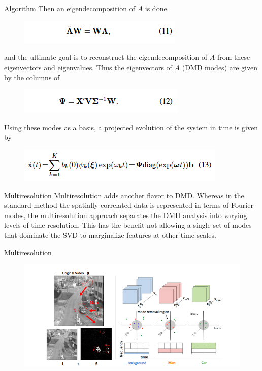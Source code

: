 \documentclass{beamer} \usepackage{graphicx,amsmath,amsfonts,amssymb,listings,tikz} \usepackage{multimedia}
\begin{document}
\begin{frame}{Algorithm}
    Then an eigendecomposition of $\widetilde{A}$ is done
    \begin{figure}
        \center
        \includegraphics[scale=0.5]{eigen.png}
    \end{figure}
    and the ultimate goal is to reconstruct the eigendecomposition of $A$ from
    these eigenvectors and eigenvalues. Thus the eigenvectors of $A$ (DMD modes)
    are given by the columns of
    \begin{figure}
        \center
        \includegraphics[scale=0.5]{dmdmodes.png}
    \end{figure}
    Using these modes as a basis, a projected evolution of the system in time is
    given by
    \begin{figure}
        \center
        \includegraphics[scale=0.5]{predicted.png}
    \end{figure}
\end{frame}

\begin{frame}{Multiresolution}
    Multiresolution adds another flavor to DMD. Whereas in the standard method
    the spatially correlated data is represented in terms of Fourier modes, the
    multiresolution approach separates the DMD analysis into varying levels of
    time resolution. This has the benefit not allowing a single set of modes
    that dominate the SVD to marginalize features at other time scales.

\end{frame}

\begin{frame}{Multiresolution}
    \begin{figure}
        \center
        \includegraphics[scale=0.3]{example.png}
    \end{figure}
\end{frame}
\end{document}
